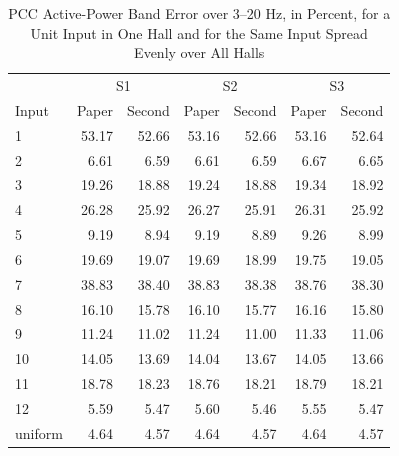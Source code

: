 \begin{table}[H]
\centering\small
\caption{PCC Active-Power Band Error over 3--20 Hz, in Percent, for a Unit Input in One Hall and for the Same Input Spread Evenly over All Halls}
\label{tab:hall-band}
\begin{tabular}{lrrrrrr}\toprule
 & \multicolumn{2}{c}{S1} & \multicolumn{2}{c}{S2} & \multicolumn{2}{c}{S3}\\
Input & Paper & Second & Paper & Second & Paper & Second\\\midrule
1 & 53.17 & 52.66 & 53.16 & 52.66 & 53.16 & 52.64 \\
2 & 6.61 & 6.59 & 6.61 & 6.59 & 6.67 & 6.65 \\
3 & 19.26 & 18.88 & 19.24 & 18.88 & 19.34 & 18.92 \\
4 & 26.28 & 25.92 & 26.27 & 25.91 & 26.31 & 25.92 \\
5 & 9.19 & 8.94 & 9.19 & 8.89 & 9.26 & 8.99 \\
6 & 19.69 & 19.07 & 19.69 & 18.99 & 19.75 & 19.05 \\
7 & 38.83 & 38.40 & 38.83 & 38.38 & 38.76 & 38.30 \\
8 & 16.10 & 15.78 & 16.10 & 15.77 & 16.16 & 15.80 \\
9 & 11.24 & 11.02 & 11.24 & 11.00 & 11.33 & 11.06 \\
10 & 14.05 & 13.69 & 14.04 & 13.67 & 14.05 & 13.66 \\
11 & 18.78 & 18.23 & 18.76 & 18.21 & 18.79 & 18.21 \\
12 & 5.59 & 5.47 & 5.60 & 5.46 & 5.55 & 5.47 \\
\midrule
uniform & 4.64 & 4.57 & 4.64 & 4.57 & 4.64 & 4.57 \\
\bottomrule\end{tabular}\end{table}

